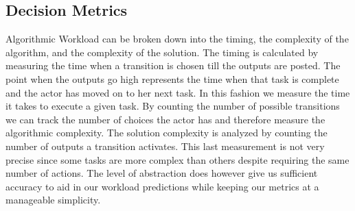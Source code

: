 \subsection{Decision Metrics}
Algorithmic Workload can be broken down into the timing, the complexity of the algorithm, and the complexity of the solution. The timing is calculated by measuring the time when a transition is chosen till the outputs are posted. The point when the outputs go high represents the time when that task is complete and the actor has moved on to her next task. In this fashion we measure the time it takes to execute a given task. By counting the number of possible transitions we can track the number of choices the actor has and therefore measure the algorithmic complexity. The solution complexity is analyzed by counting the number of outputs a transition activates. This last measurement is not very precise since some tasks are more complex than others despite requiring the same number of actions. The level of abstraction does however give us sufficient accuracy to aid in our workload predictions while keeping our metrics at a manageable simplicity.